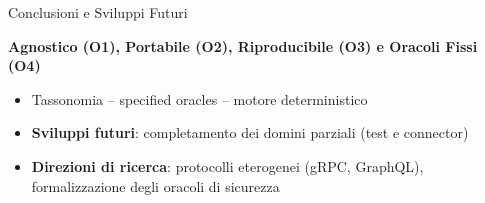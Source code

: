 
\begin{frame}{Conclusioni e Sviluppi Futuri}
  \begin{center}
    \textbf{Agnostico (O1), Portabile (O2), Riproducibile (O3) e Oracoli Fissi (O4)}
  \end{center}
  \begin{itemize}
    \item \alert{Tassonomia} -- \alert{specified oracles} -- \alert{motore deterministico}

    \item \textbf{Sviluppi futuri}: completamento dei \alert{domini parziali} (test e connector)

    \item \textbf{Direzioni di ricerca}: \alert{protocolli eterogenei} (gRPC, GraphQL), formalizzazione degli \alert{oracoli di sicurezza}
  \end{itemize}
\end{frame}